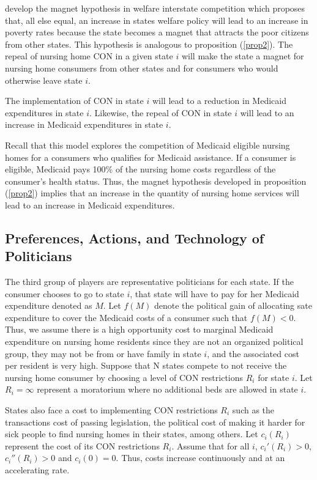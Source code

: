 \documentclass[../Main.tex]{subfiles}
\begin{document}
\citet{peterson1989american} develop the magnet hypothesis in welfare interstate competition which proposes that, all else equal, an increase in states welfare policy will lead to an increase in poverty rates because the state becomes a magnet that attracts the poor citizens from other states. This hypothesis is analogous to proposition (\ref{prop2}). The repeal of nursing home CON in a given state $i$ will make the state a magnet for nursing home consumers from other states and for consumers who would otherwise leave state $i$.

\begin{Proposition} \label{prop3}
The implementation of CON in state $i$ will lead to a reduction in Medicaid expenditures in state $i$. Likewise, the repeal of CON in state $i$ will lead to an increase in Medicaid expenditures in state $i$.  
\end{Proposition}

Recall that this model explores the competition of Medicaid eligible nursing homes for a consumers who qualifies for Medicaid assistance. If a consumer is eligible, Medicaid pays 100\% of the nursing home costs regardless of the consumer's health status. Thus, the magnet hypothesis developed in proposition (\ref{prop2}) implies that an increase in the quantity of nursing home services will lead to an increase in Medicaid expenditures.

\subsection{Preferences, Actions, and Technology of Politicians}

The third group of players are representative politicians for each state. If the consumer chooses to go to state $i$, that state will have to pay for her Medicaid expenditure denoted as $M$. Let $f(M)$ denote the political gain of allocating sate expenditure to cover the Medicaid costs of a consumer such that $f(M)<0$. Thus, we assume there is a high opportunity cost to marginal Medicaid expenditure on nursing home residents since they are not an organized political group, they may not be from or have family in state $i$, and the associated cost per resident is very high. Suppose that N states compete to not receive the nursing home consumer by choosing a level of CON restrictions $R_i$ for state $i$. Let $R_i= \infty$ represent a moratorium where no additional beds are allowed in state $i$. 

States also face a cost to implementing CON restrictions $R_i$ such as the transactions cost of passing legislation, the political cost of making it harder for sick people to find nursing homes in their states, among others. Let $c_i(R_i)$ represent the cost of its CON restrictions $R_i$. Assume that for all $i$, $c_i'(R_i)>0$, $c_i''(R_i)>0$ and $c_i(0)=0$. Thus, costs increase continuously and at an accelerating rate.
\end{document}
